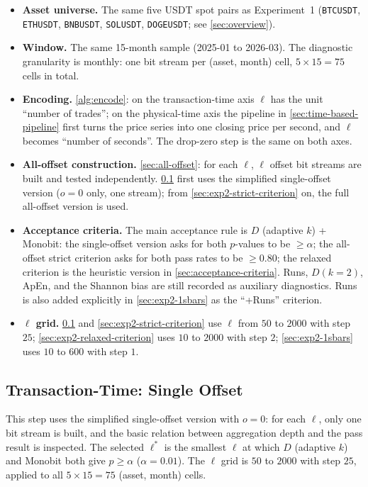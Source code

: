 \documentclass[11pt,titlepage,openany,oneside]{book}  %
\begin{document}
\begin{itemize}
\item \textbf{Asset universe.} The same five USDT spot pairs as Experiment~1 (\texttt{BTCUSDT}, \texttt{ETHUSDT}, \texttt{BNBUSDT}, \texttt{SOLUSDT}, \texttt{DOGEUSDT}; see \cref{sec:overview}).
\item \textbf{Window.} The same 15-month sample (2025-01 to 2026-03). The diagnostic granularity is monthly: one bit stream per (asset, month) cell, $5 \times 15 = 75$ cells in total.
\item \textbf{Encoding.} \cref{alg:encode}: on the transaction-time axis $\ell$ has the unit ``number of trades''; on the physical-time axis the pipeline in \cref{sec:time-based-pipeline} first turns the price series into one closing price per second, and $\ell$ becomes ``number of seconds''. The drop-zero step is the same on both axes.
\item \textbf{All-offset construction.} \cref{sec:all-offset}: for each $\ell$, $\ell$ offset bit streams are built and tested independently. \cref{sec:exp2-single-offset} first uses the simplified single-offset version ($o = 0$ only, one stream); from \cref{sec:exp2-strict-criterion} on, the full all-offset version is used.
\item \textbf{Acceptance criteria.} The main acceptance rule is $D$ (adaptive $k$) + Monobit: the single-offset version asks for both $p$-values to be $\geq \alpha$; the all-offset strict criterion asks for both pass rates to be $\geq 0.80$; the relaxed criterion is the heuristic version in \cref{sec:acceptance-criteria}. Runs, $D(k = 2)$, ApEn, and the Shannon bias are still recorded as auxiliary diagnostics. Runs is also added explicitly in \cref{sec:exp2-1sbars} as the ``+Runs'' criterion.
\item \textbf{$\ell$ grid.} \cref{sec:exp2-single-offset} and \cref{sec:exp2-strict-criterion} use $\ell$ from $50$ to $2000$ with step $25$; \cref{sec:exp2-relaxed-criterion} uses $10$ to $2000$ with step $2$; \cref{sec:exp2-1sbars} uses $10$ to $600$ with step $1$.
\end{itemize}

\subsection{Transaction-Time: Single Offset}
\label{sec:exp2-single-offset}

This step uses the simplified single-offset version with $o = 0$: for each $\ell$, only one bit stream is built, and the basic relation between aggregation depth and the pass result is inspected. The selected $\ell^*$ is the smallest $\ell$ at which $D$ (adaptive $k$) and Monobit both give $p \geq \alpha$ ($\alpha = 0.01$). The $\ell$ grid is $50$ to $2000$ with step $25$, applied to all $5 \times 15 = 75$ (asset, month) cells.
\end{document}
